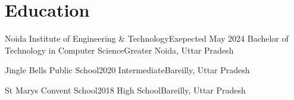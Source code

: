 \section{Education}
\resumeSubHeadingListStart

    \resumeSubheading
    {Noida Institute of Engineering \& Technology}{Exepected May 2024}
    {Bachelor of Technology in Computer Science}{Greater Noida, Uttar Pradesh}
    
    \resumeSubheading
    {Jingle Bells Public School}{2020}
    {Intermediate}{Bareilly, Uttar Pradesh}

    \resumeSubheading
    {St Marys Convent School}{2018}
    {High School}{Bareilly, Uttar Pradesh}

\resumeSubHeadingListEnd